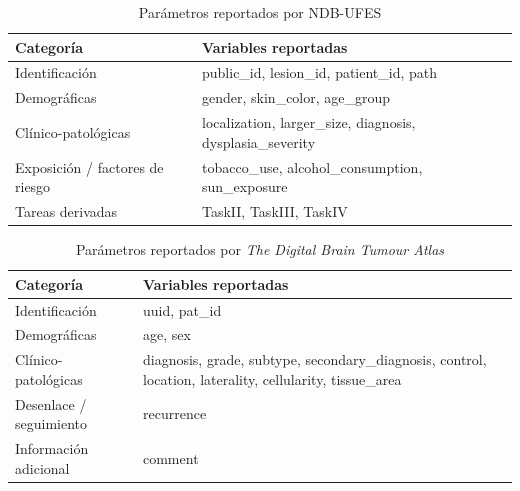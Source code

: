 \begin{table}[ht]
\centering
\caption{Parámetros reportados por NDB-UFES}
\label{tab:parametros_ndbufes}
\renewcommand{\arraystretch}{1.2}
\begin{tabularx}{\textwidth}{lX}
\toprule
\textbf{Categoría} & \textbf{Variables reportadas} \\
\midrule
Identificación & public\_id, lesion\_id, patient\_id, path \\
Demográficas & gender, skin\_color, age\_group \\
Clínico-patológicas & localization, larger\_size, diagnosis, dysplasia\_severity \\
Exposición / factores de riesgo & tobacco\_use, alcohol\_consumption, sun\_exposure \\
Tareas derivadas & TaskII, TaskIII, TaskIV \\
\bottomrule
\end{tabularx}
\end{table}

\begin{table}[ht]
\centering
\caption{Parámetros reportados por \textit{The Digital Brain Tumour Atlas}}
\label{tab:parametros_tdbta}
\renewcommand{\arraystretch}{1.2}
\begin{tabularx}{\textwidth}{lX}
\toprule
\textbf{Categoría} & \textbf{Variables reportadas} \\
\midrule
Identificación & uuid, pat\_id \\
Demográficas & age, sex \\
Clínico-patológicas & diagnosis, grade, subtype, secondary\_diagnosis, control, location, laterality, cellularity, tissue\_area \\
Desenlace / seguimiento & recurrence \\
Información adicional & comment \\
\bottomrule
\end{tabularx}
\end{table}

